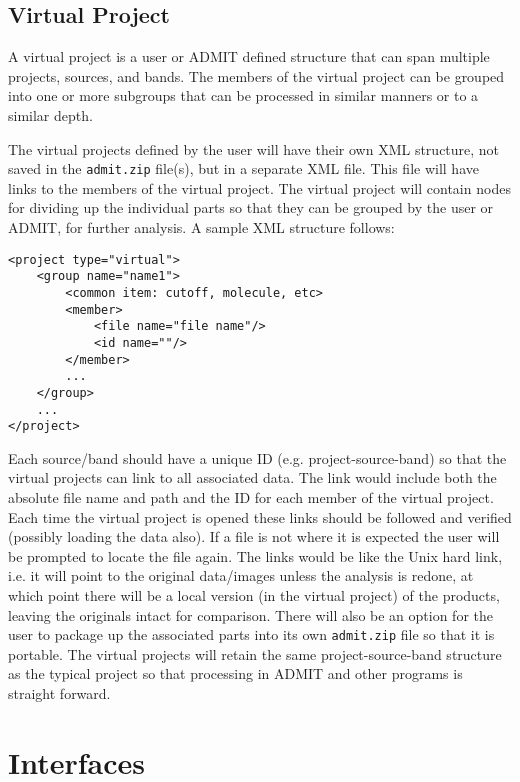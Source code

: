\documentclass{article}
\begin{document}
%
\subsection{Virtual Project}
A virtual project is a user or ADMIT defined structure that can span multiple projects, sources, and bands. The members of the virtual project can be grouped into one or more subgroups that can be processed in similar manners or to a similar depth.

The virtual projects defined by the user will have their own XML
structure, not saved in the {\tt admit.zip} file(s), but in a separate XML
file. This file will have links to the members of the virtual project. The
virtual project will contain nodes for dividing up the individual
parts so that they can be grouped by the user or ADMIT, for further
analysis. A sample XML structure follows:


\begin{verbatim}
<project type="virtual">
    <group name="name1">
    	<common item: cutoff, molecule, etc>
    	<member>
    		<file name="file name"/>
    		<id name=""/>
    	</member>
    	...
    </group>
    ...
</project>
\end{verbatim}

Each source/band should have a unique ID (e.g. project-source-band) so
that the virtual projects can link to all associated data. The link
would include both the absolute file name and path and the ID for each
member of the virtual project. Each time the virtual project is opened
these links should be followed and verified (possibly loading the data
also). If a file is not where it is expected the user will be prompted
to locate the file again. The links would be like the Unix hard link,
i.e. it will point to the original data/images unless the analysis is
redone, at which point there will be a local version (in the virtual
project) of the products, leaving the originals intact for
comparison. There will also be an option for the user to package up
the associated parts into its own {\tt admit.zip} file so that it is
portable. The virtual projects will retain the same
project-source-band structure as the typical project so that
processing in ADMIT and other programs is straight forward.

\section{Interfaces}
\end{document}
